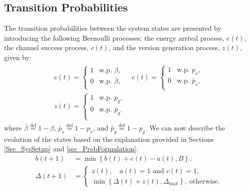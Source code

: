 \documentclass[lettersize,journal]{IEEEtran}
\begin{document}
    \subsection{Transition Probabilities}
    \label{sec_TransProb}
    The transition probabilities between the system states are presented by introducing the following Bernoulli processes: the energy arrival process, $\mathit{\textit{e}}(t)$, the channel success process, $\mathit{\textit{c}}(t)$, and the version generation process, $\mathit{\textit{z}}(t)$, given by:
	\begin{align}
		\label{BernoulliProcesses}
		\begin{matrix}
			\mathit{\textit{e}}(t) \!=\!
			\begin{cases}
				1 & \text{w.p. } \beta, \\
				0 & \text{w.p. } \bar{\beta}, \\
			\end{cases} & 
			\mathit{\textit{c}}(t) \!=\! 
			\begin{cases}
				1 & \text{w.p. } p_s, \\
				0 & \text{w.p. } \bar{p}_s, \\
			\end{cases} \\
			\mathit{\textit{z}}(t) \!=\! 
			\begin{cases}
				1 & \text{w.p. } p_g, \\
				0 & \text{w.p. } \bar{p}_g. \\
			\end{cases}
		\end{matrix}
	\end{align}
    where $\bar{\beta}\overset{\text{def}}{=}1-\beta$, $\bar{p}_s\overset{\text{def}}{=}1-p_s$, and $\bar{p}_g\overset{\text{def}}{=}1-p_g$. 
	We can now describe the evolution of the states based on the explanation provided in Sections \ref{Sec_SysSetup} and \ref{sec_ProbFormulation}:
	\begin{align}
		b(t\!+\!1) &\!=\! \min \left\{ b(t) \!+\! \mathit{\textit{e}}(t) \!-\! a(t) ,B \right\}. \\
		\Delta(t\!+\!1) 
		& \!=\! \begin{cases}
			\mathit{\textit{z}}(t), \quad  a(t)\!=\!1 \text{ and } \mathit{\textit{c}}(t)\!=\!1, \\
			\min \! \left\{ \Delta(t) \!+\! \mathit{\textit{z}}(t) ,\Delta_{\text{max}} \right\}\!, \ \text{otherwise.}
		\end{cases}
	\end{align}
	
\end{document}
